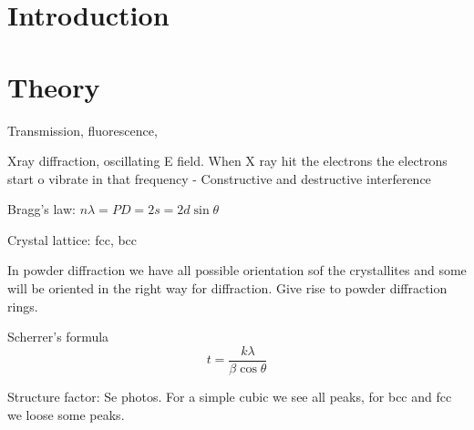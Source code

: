 \section{Introduction}

\section{Theory}
\cite{hofmann2015}

Transmission, fluorescence, 

Xray diffraction, oscillating E field. When X ray hit the electrons the electrons start o vibrate in that frequency
- Constructive and destructive interference 

Bragg's law: $n\lambda=PD=2s=2d\sin\theta$

Crystal lattice: fcc, bcc

In powder diffraction we have all possible orientation sof the crystallites and some will be oriented in the right way for diffraction. Give rise to powder diffraction rings. 

Scherrer's formula
\begin{equation}
    t=\frac{k\lambda}{\beta\cos\theta}
\end{equation}

Structure factor: Se photos. For a simple cubic we see all peaks, for bcc and fcc we loose some peaks. 

